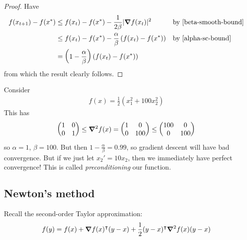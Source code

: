 \documentclass{../template/note}
\begin{document}
    \begin{proof}
        Have
        \begin{align*}
            f(x_{t+1}) - f(x^*) &\leq f(x_t) - f(x^*) - \frac 1 {2\beta} |\grad f(x_t)|^2 && \text{by \cref{beta-smooth-bound}} \\
            &\leq f(x_t) - f(x^*) - \frac \alpha \beta \left(f(x_t)-f(x^*)\right) && \text{by \cref{alpha-sc-bound}} \\
            &= \left(1-\frac \alpha\beta\right)\left(f(x_t)-f(x^*)\right)
        \end{align*}
        from which the result clearly follows.        
    \end{proof}
    
    \begin{example}
        Consider
        \begin{align*}
            f(x) = \frac 1 2 (x_1^2 + 100 x_2^2)
        \end{align*}
        This has
        \begin{align*}
            \begin{pmatrix}
                1 & 0 \\
                0 & 1 \\
            \end{pmatrix} \leq \grad^2 f(x) = \begin{pmatrix}
                1 & 0 \\
                0 & 100 \\
            \end{pmatrix}\leq \begin{pmatrix}
                100 & 0 \\
                0 & 100 \\
            \end{pmatrix}
        \end{align*}
        so $\alpha = 1$, $\beta = 100$. But then $1 - \frac \alpha \beta = 0.99$, so gradient descent will have bad convergence. But if we just let $x_2' = 10x_2$, then we immediately have perfect convergence! This is called \emph{preconditioning} our function.       
    \end{example}

    \subsection{Newton's method}
    
    Recall the second-order Taylor approximation:
    \begin{align*}
        f(y) = f(x) + \grad f(x)^\intercal (y-x) + \frac 1 2 (y-x)^\intercal \grad^2 f(x) (y-x)
    \end{align*}
    
\end{document}

